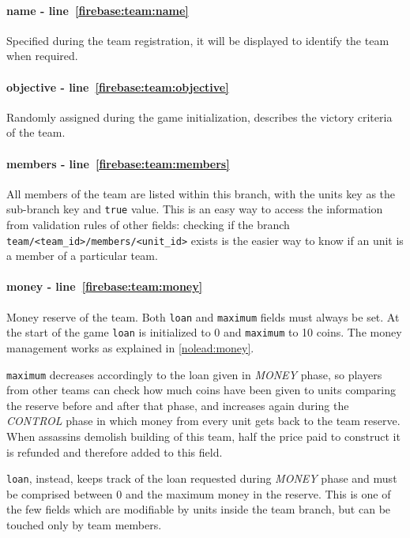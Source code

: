 				\paragraph{name - line~\ref{firebase:team:name}}
				Specified during the team registration, it will be displayed to identify the team when required.
				
				\paragraph{objective - line~\ref{firebase:team:objective}}
				Randomly assigned during the game initialization, describes the victory criteria of the team.
			
				\paragraph{members - line~\ref{firebase:team:members}}
				All members of the team are listed within this branch, with the units key as the sub-branch key and \lstinline|true| value. This is an easy way to access the information from validation rules of other fields: checking if the branch \lstinline|team/<team_id>/members/<unit_id>| exists is the easier way to know if an unit is a member of a particular team.
			
				\paragraph{money - line~\ref{firebase:team:money}}
				Money reserve of the team. Both \lstinline|loan| and \lstinline|maximum| fields must always be set. At the start of the game \lstinline|loan| is initialized to 0 and \lstinline|maximum| to 10 coins.
				The money management works as explained in \autoref{nolead:money}.
				
				\lstinline|maximum| decreases accordingly to the loan given in \emph{MONEY} phase, so players from other teams can check how much coins have been given to units comparing the reserve before and after that phase, and increases again during the \emph{CONTROL} phase in which money from every unit gets back to the team reserve.
				When assassins demolish building of this team, half the price paid to construct it is refunded and therefore added to this field.
				
				\lstinline|loan|, instead, keeps track of the loan requested during \emph{MONEY} phase and must be comprised between 0 and the maximum money in the reserve. This is one of the few fields which are modifiable by units inside the team branch, but can be touched only by team members.
				
